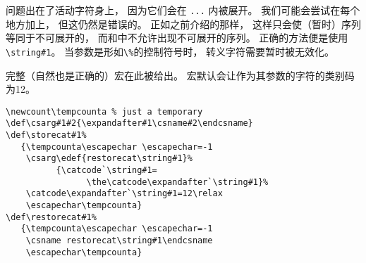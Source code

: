 \documentclass{book}
\begin{document}
% 
问题出在了活动字符身上，
因为它们会在 \verb>...> 内被展开。
我们可能会尝试在每个地方加上，
但这仍然是错误的。
正如之前介绍的那样，
这样只会使（暂时）序列等同于不可展开的，
而和中不允许出现不可展开的序列。
正确的方法便是使用\verb>\string#1>。
当参数是形如\verb>\%>的控制符号时，
转义字符需要暂时被无效化。
 
完整（自然也是正确的）宏在此被给出。
宏默认会让作为其参数的字符的类别码为12。
\begin{verbatim}
\newcount\tempcounta % just a temporary
\def\csarg#1#2{\expandafter#1\csname#2\endcsname}
\def\storecat#1%
   {\tempcounta\escapechar \escapechar=-1
    \csarg\edef{restorecat\string#1}%
          {\catcode`\string#1=
                \the\catcode\expandafter`\string#1}%
    \catcode\expandafter`\string#1=12\relax
    \escapechar\tempcounta}
\def\restorecat#1%
   {\tempcounta\escapechar \escapechar=-1
    \csname restorecat\string#1\endcsname
    \escapechar\tempcounta}
\end{verbatim}

\end{document}
